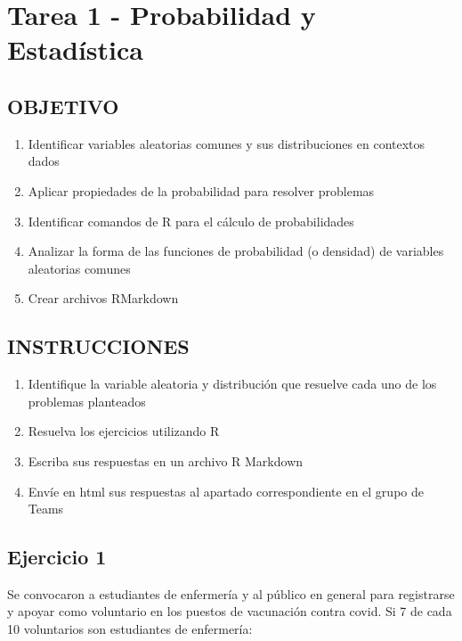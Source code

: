 \documentclass[
]{article}
\author{}
\date{\vspace{-2.5em}}
\providecommand{\tightlist}{%
  \setlength{\itemsep}{0pt}\setlength{\parskip}{0pt}}
\begin{document}
\section{Tarea 1 - Probabilidad y
Estadística}\label{tarea-1---probabilidad-y-estaduxedstica}

\subsection{OBJETIVO}\label{objetivo}

\begin{enumerate}
\def\labelenumi{\arabic{enumi}.}
\tightlist
\item
  Identificar variables aleatorias comunes y sus distribuciones en
  contextos dados
\item
  Aplicar propiedades de la probabilidad para resolver problemas
\item
  Identificar comandos de R para el cálculo de probabilidades
\item
  Analizar la forma de las funciones de probabilidad (o densidad) de
  variables aleatorias comunes
\item
  Crear archivos RMarkdown
\end{enumerate}

\subsection{INSTRUCCIONES}\label{instrucciones}

\begin{enumerate}
\def\labelenumi{\arabic{enumi}.}
\tightlist
\item
  Identifique la variable aleatoria y distribución que resuelve cada uno
  de los problemas planteados
\item
  Resuelva los ejercicios utilizando R
\item
  Escriba sus respuestas en un archivo R Markdown
\item
  Envíe en html sus respuestas al apartado correspondiente en el grupo
  de Teams
\end{enumerate}

\subsection{Ejercicio 1}\label{ejercicio-1}

Se convocaron a estudiantes de enfermería y al público en general para
registrarse y apoyar como voluntario en los puestos de vacunación contra
covid. Si 7 de cada 10 voluntarios son estudiantes de enfermería:
\end{document}
